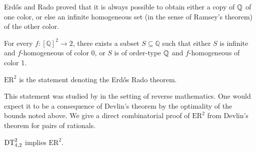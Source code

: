 Erd\H{o}s and Rado proved that it is always possible to obtain either a copy of $\mathbb{Q}$ of one color, or else an infinite homogeneous set (in the sense of Ramsey's theorem) of the other color.
\begin{theorem}
  For every $f:[\mathbb Q]^2\to 2$, there exists a subset $S\subseteq\mathbb Q$ such that either $S$ is infinite and $f$-homogeneous of color 0, or $S$ is of order-type $\mathbb{Q}$ and $f$-homogeneous of color 1.
\end{theorem}
\begin{statement}
  $\mathrm{ER}^2$ is the statement denoting the Erd\H{o}s Rado theorem.
\end{statement}
This statement was studied by \cite{Chong2019Strengthc, Frittaion2017Coloring, Dzhafarov2017Coloring} in the setting of reverse mathematics. One would expect it to be a consequence of Devlin's theorem by the optimality of the bounds noted above. We give a direct combinatorial proof of $\mathrm{ER}^2$ from Devlin's theorem for pairs of rationals.
\begin{theorem}\label{th:dt242-implies-er2}
  $\mathrm{DT}^{2}_{4,2}$ implies $\mathrm{ER}^2$.
\end{theorem}
